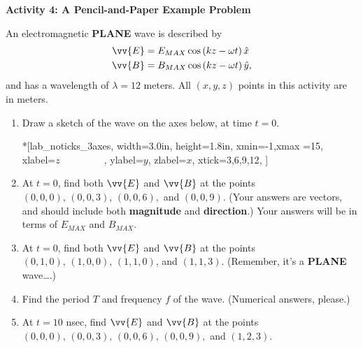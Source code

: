 \textbf{Activity 4: A Pencil-and-Paper Example Problem}

An electromagnetic \textbf{PLANE} wave is described by
\begin{align*}
\vv {E} &= E_{MAX} \cos \left ( kz - \omega t \right ) \hat x\\
\vv {B} &= B_{MAX} \cos \left ( kz - \omega t \right ) \hat y,
\end{align*}
and has a wavelength of $\lambda =12$ meters.  All $(x,y,z)$ points in this activity are in meters.

\begin{enumerate}[labparts]
\item Draw a sketch of the wave on the axes below, at time $t=0$.

\begin{lab_axis}*[lab_noticks_3axes,
	width={3.0in}, height={1.8in},
	xmin=-1,xmax =15,
	xlabel={$z$~~~~~~~~~},  %
	ylabel=$y$,
	zlabel=$x$,
	xtick={3,6,9,12},
	]
\end{lab_axis}
\answerspace{0.1in}

\item At $t=0$, find both $\vv {E}$ and $\vv {B}$ at the points $(0,0,0), \,(0,0,3), \,(0,0,6),$ and $(0,0,9)$.  (Your answers are vectors, and should include both \textbf{magnitude} and \textbf{direction}.)  Your answers will be in terms of
$E_{MAX}$ and $B_{MAX}$.
\vspace{1.0in}

\item At $t=0$, find both $\vv {E}$ and $\vv {B}$ at the points $(0,1,0), \,(1,0,0), \,(1,1,0)$, and $(1,1,3)$.  (Remember, it's a \textbf{PLANE} wave….)
\vspace{1.0in}

\item Find the period $T$ and frequency $f$ of the wave.  (Numerical answers, please.)
\vspace{1.0in}

\item At $t=10$ nsec, find $\vv {E}$ and $\vv {B}$ at the points $(0,0,0), \,(0,0,3), \,(0,0,6), \,(0,0,9),$ and $(1,2,3)$.  
\vspace{1.0in}
\end{enumerate}


